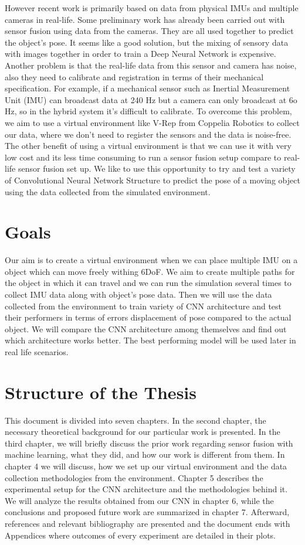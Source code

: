 However recent work is primarily based on data from physical IMUs and multiple cameras in real-life. Some preliminary work has already been carried out with sensor fusion using data from the cameras. They are all used together to predict the object's pose. It seems like a good solution, but the mixing of sensory data with images together in order to train a Deep Neural Network is expensive. Another problem is that the real-life data from this sensor and camera has noise, also they need to calibrate and registration in terms of their mechanical specification. For example, if a  mechanical sensor such as Inertial Measurement Unit (IMU) can broadcast data at 240 Hz but a camera can only broadcast at 6o Hz, so in the hybrid system it's difficult to calibrate. 
To overcome this problem, we aim to use a virtual environment like V-Rep from Coppelia Robotics to collect our data, where we don't need to register the sensors and the data is noise-free. The other benefit of using a virtual environment is that we can use it with very low cost and its less time consuming to run a sensor fusion setup compare to real-life sensor fusion set up. We like to use this opportunity to try and test a variety of Convolutional Neural Network Structure to predict the pose of a moving object using the data collected from the simulated environment.


\section{Goals}

Our aim is to create a virtual environment when we can place multiple IMU on a object which can move freely withing 6DoF. We aim to create multiple paths for the object in which it can travel and we can run the simulation several times to collect IMU data along with object’s pose data. Then we will use the data collected from the environment to train variety of CNN architecture and test  their performers in terms of errors displacement of pose compared to the actual object. We will compare the CNN architecture among themselves and find out which architecture works better. The best performing model will be used later in real life scenarios. 


\section{Structure of the Thesis}

This document is divided into seven chapters. In the second chapter, the necessary theoretical background for our particular work is presented. In the third chapter, we will briefly discuss the prior work regarding sensor fusion with machine learning, what they did, and how our work is different from them. In chapter 4 we will discuss, how we set up our virtual environment and the data collection methodologies from the environment. Chapter 5 describes the experimental setup for the CNN architecture and the methodologies behind it. We will analyze the results obtained from our CNN in chapter 6, while the conclusions and proposed future work are summarized in chapter 7. Afterward, references and relevant bibliography are presented and the document ends with Appendices where outcomes of every experiment are detailed in their plots.
